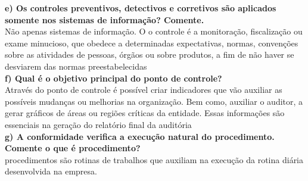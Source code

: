 \documentclass[12pt]{article}
\begin{document}
\textbf{e) Os controles preventivos, detectivos e corretivos são aplicados somente nos sistemas de informação? Comente.}
\\
Não apenas sistemas de informação. O o controle é a monitoração, fiscalização ou exame minucioso, que obedece a determinadas expectativas, normas, convenções sobre as atividades de pessoas, órgãos ou sobre produtos, a fim de não haver se desviarem das normas preestabelecidas
\\

\textbf{f) Qual é o objetivo principal do ponto de controle?}
\\
Através do ponto de controle é possível criar indicadores que vão auxiliar as possíveis mudanças ou melhorias na organização. Bem como, auxiliar o auditor, a gerar gráficos de áreas ou regiões críticas da entidade. Essas informações são essenciais na geração do relatório final da auditória
\\

\textbf{g) A conformidade verifica a execução natural do procedimento. Comente o que é procedimento?}
\\
procedimentos são rotinas de trabalhos que auxiliam na execução da rotina diária desenvolvida na empresa.
\end{document}
